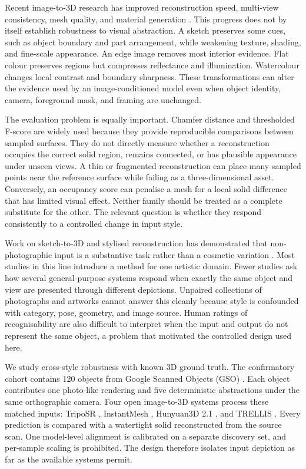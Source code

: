\documentclass[12pt,a4paper]{article}
\begin{document}
Recent image-to-3D research has improved reconstruction speed, multi-view consistency, mesh quality, and material generation \parencite{liu2023zero123,liu2023one2345,liu2023one2345pp,long2023wonder3d,long2025wonder3dpp,wang2024crm,wei2024meshlrm,wu2024unique3d,liu2024meshformer,wang2025mage}. This progress does not by itself establish robustness to visual abstraction. A sketch preserves some cues, such as object boundary and part arrangement, while weakening texture, shading, and fine-scale appearance. An edge image removes most interior evidence. Flat colour preserves regions but compresses reflectance and illumination. Watercolour changes local contrast and boundary sharpness. These transformations can alter the evidence used by an image-conditioned model even when object identity, camera, foreground mask, and framing are unchanged.

The evaluation problem is equally important. Chamfer distance and thresholded F-score are widely used because they provide reproducible comparisons between sampled surfaces. They do not directly measure whether a reconstruction occupies the correct solid region, remains connected, or has plausible appearance under unseen views. A thin or fragmented reconstruction can place many sampled points near the reference surface while failing as a three-dimensional asset. Conversely, an occupancy score can penalise a mesh for a local solid difference that has limited visual effect. Neither family should be treated as a complete substitute for the other. The relevant question is whether they respond consistently to a controlled change in input style.

Work on sketch-to-3D and stylised reconstruction has demonstrated that non-photographic input is a substantive task rather than a cosmetic variation \parencite{sanghi2023sketchashape,chen2023panic3d,zheng2024sketch3d,zhou2024drawingspinup,lee2025pasta,cong2025art3d}. Most studies in this line introduce a method for one artistic domain. Fewer studies ask how several general-purpose systems respond when exactly the same object and view are presented through different depictions. Unpaired collections of photographs and artworks cannot answer this cleanly because style is confounded with category, pose, geometry, and image source. Human ratings of recognisability are also difficult to interpret when the input and output do not represent the same object, a problem that motivated the controlled design used here.

We study cross-style robustness with known 3D ground truth. The confirmatory cohort contains 120 objects from Google Scanned Objects (GSO) \parencite{downs2022gso}. Each object contributes one photo-like rendering and five deterministic abstractions under the same orthographic camera. Four open image-to-3D systems process these matched inputs: TripoSR \parencite{tochilkin2024triposr}, InstantMesh \parencite{xu2024instantmesh}, Hunyuan3D 2.1 \parencite{hunyuan3d2025}, and TRELLIS \parencite{xiang2025trellis}. Every prediction is compared with a watertight solid reconstructed from the source scan. One model-level alignment is calibrated on a separate discovery set, and per-sample scaling is prohibited. The design therefore isolates input depiction as far as the available systems permit.
\end{document}
